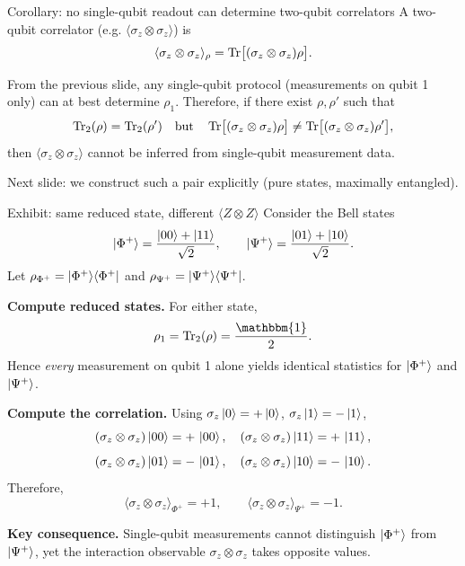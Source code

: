 \documentclass[aspectratio=169]{beamer}
\newcommand{\Z}{\sigma_z}
\newcommand{\I}{\mathbbm{1}}
\begin{document}
\begin{frame}{Corollary: no single-qubit readout can determine two-qubit correlators}
A two-qubit correlator (e.g. \(\langle \Z\otimes\Z\rangle\)) is
\[
\langle \Z\otimes\Z\rangle_\rho=\Tr\!\big[(\Z\otimes\Z)\rho\big].
\]

From the previous slide, any single-qubit protocol (measurements on qubit 1 only) can at best determine \(\rho_1\).
Therefore, if there exist \(\rho,\rho'\) such that
\[
\Tr_2(\rho)=\Tr_2(\rho') \quad \text{but} \quad
\Tr\!\big[(\Z\otimes\Z)\rho\big]\neq \Tr\!\big[(\Z\otimes\Z)\rho'\big],
\]
then \(\langle \Z\otimes\Z\rangle\) cannot be inferred from single-qubit measurement data.

\medskip
Next slide: we construct such a pair explicitly (pure states, maximally entangled).
\end{frame}

\begin{frame}{Exhibit: same reduced state, different \(\langle Z\otimes Z\rangle\)}
Consider the Bell states
\[
\ket{\Phi^+}=\frac{\ket{00}+\ket{11}}{\sqrt{2}},\qquad
\ket{\Psi^+}=\frac{\ket{01}+\ket{10}}{\sqrt{2}}.
\]
Let \(\rho_{\Phi^+}=\ket{\Phi^+}\!\bra{\Phi^+}\) and \(\rho_{\Psi^+}=\ket{\Psi^+}\!\bra{\Psi^+}\).

\medskip
\textbf{Compute reduced states.}
For either state,
\[
\rho_1=\Tr_2(\rho)=\frac{\I}{2}.
\]
Hence \emph{every} measurement on qubit 1 alone yields identical statistics for \(\ket{\Phi^+}\) and \(\ket{\Psi^+}\).

\medskip
\textbf{Compute the correlation.}
Using \(\Z\ket{0}=+\ket{0}\), \(\Z\ket{1}=-\ket{1}\),
\[
(\Z\otimes\Z)\ket{00}=+\,\ket{00},\quad (\Z\otimes\Z)\ket{11}=+\,\ket{11},
\]
\[
(\Z\otimes\Z)\ket{01}=-\,\ket{01},\quad (\Z\otimes\Z)\ket{10}=-\,\ket{10}.
\]
Therefore,
\[
\langle \Z\otimes\Z\rangle_{\Phi^+}=+1,\qquad
\langle \Z\otimes\Z\rangle_{\Psi^+}=-1.
\]

\medskip
\textbf{Key consequence.} Single-qubit measurements cannot distinguish \(\ket{\Phi^+}\) from \(\ket{\Psi^+}\),
yet the interaction observable \(\Z\otimes\Z\) takes opposite values.
\end{frame}
\end{document}
